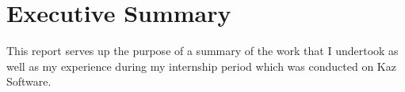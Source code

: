 \chapter*{Executive Summary}

This report serves up the purpose of a summary of the work that I undertook as well as my experience during my internship period which was conducted on Kaz Software.